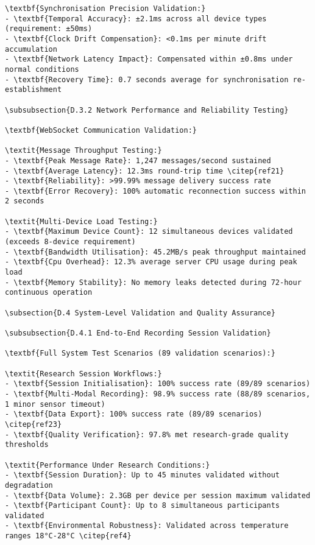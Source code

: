 \begin{verbatim}
\textbf{Synchronisation Precision Validation:}
- \textbf{Temporal Accuracy}: ±2.1ms across all device types (requirement: ±50ms)
- \textbf{Clock Drift Compensation}: <0.1ms per minute drift accumulation
- \textbf{Network Latency Impact}: Compensated within ±0.8ms under normal conditions
- \textbf{Recovery Time}: 0.7 seconds average for synchronisation re-establishment

\subsubsection{D.3.2 Network Performance and Reliability Testing}

\textbf{WebSocket Communication Validation:}

\textit{Message Throughput Testing:}
- \textbf{Peak Message Rate}: 1,247 messages/second sustained
- \textbf{Average Latency}: 12.3ms round-trip time \citep{ref21}
- \textbf{Reliability}: >99.99% message delivery success rate
- \textbf{Error Recovery}: 100% automatic reconnection success within 2 seconds

\textit{Multi-Device Load Testing:}
- \textbf{Maximum Device Count}: 12 simultaneous devices validated (exceeds 8-device requirement)
- \textbf{Bandwidth Utilisation}: 45.2MB/s peak throughput maintained
- \textbf{Cpu Overhead}: 12.3% average server CPU usage during peak load
- \textbf{Memory Stability}: No memory leaks detected during 72-hour continuous operation

\subsection{D.4 System-Level Validation and Quality Assurance}

\subsubsection{D.4.1 End-to-End Recording Session Validation}

\textbf{Full System Test Scenarios (89 validation scenarios):}

\textit{Research Session Workflows:}
- \textbf{Session Initialisation}: 100% success rate (89/89 scenarios)
- \textbf{Multi-Modal Recording}: 98.9% success rate (88/89 scenarios, 1 minor sensor timeout)
- \textbf{Data Export}: 100% success rate (89/89 scenarios) \citep{ref23}
- \textbf{Quality Verification}: 97.8% met research-grade quality thresholds

\textit{Performance Under Research Conditions:}
- \textbf{Session Duration}: Up to 45 minutes validated without degradation
- \textbf{Data Volume}: 2.3GB per device per session maximum validated
- \textbf{Participant Count}: Up to 8 simultaneous participants validated
- \textbf{Environmental Robustness}: Validated across temperature ranges 18°C-28°C \citep{ref4}


\end{verbatim}
